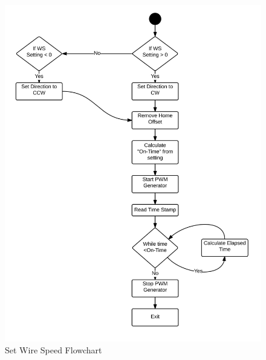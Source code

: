 \documentclass[12pt]{article}
\begin{document}
\clearpage


\begin{figure}[!h]
\centering
\includegraphics[scale=1.1]{setspeed}
\caption{Set Wire Speed Flowchart}
\end{figure}

\clearpage
\end{document}
